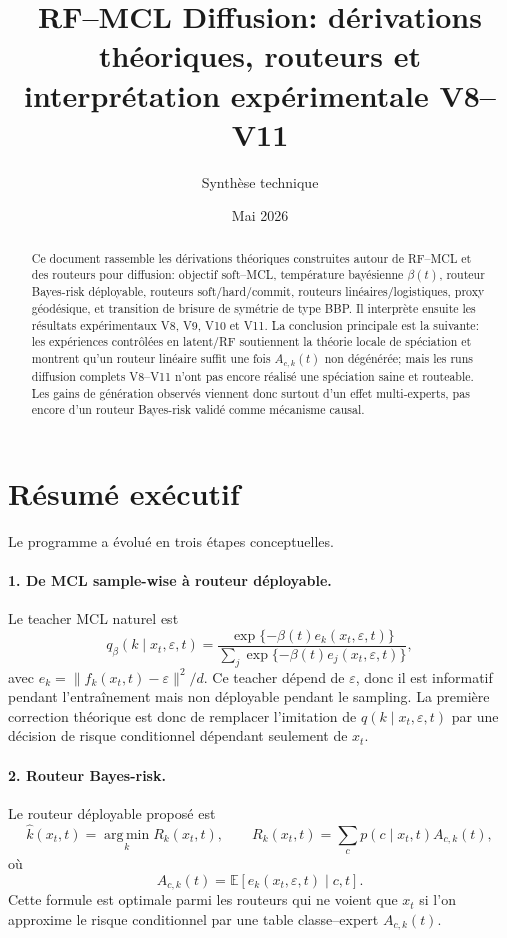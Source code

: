 \documentclass[11pt,a4paper]{article}
\title{RF--MCL Diffusion: dérivations théoriques, routeurs et interprétation expérimentale V8--V11}
\author{Synthèse technique}
\date{Mai 2026}
\newcommand{\E}{\mathbb{E}}
\newcommand{\argmin}{\operatorname*{arg\,min}}
\newcommand{\1}{\mathbf{1}}
\newcommand{\eps}{\varepsilon}
\newcommand{\xt}{x_t}
\begin{document}
\maketitle

\begin{abstract}
Ce document rassemble les dérivations théoriques construites autour de RF--MCL et des routeurs pour diffusion: objectif soft--MCL, température bayésienne $\beta(t)$, routeur Bayes-risk déployable, routeurs soft/hard/commit, routeurs linéaires/logistiques, proxy géodésique, et transition de brisure de symétrie de type BBP. Il interprète ensuite les résultats expérimentaux V8, V9, V10 et V11. La conclusion principale est la suivante: les expériences contrôlées en latent/RF soutiennent la théorie locale de spéciation et montrent qu'un routeur linéaire suffit une fois $A_{c,k}(t)$ non dégénérée; mais les runs diffusion complets V8--V11 n'ont pas encore réalisé une spéciation saine et routeable. Les gains de génération observés viennent donc surtout d'un effet multi-experts, pas encore d'un routeur Bayes-risk validé comme mécanisme causal.
\end{abstract}

\tableofcontents
\newpage

\section{Résumé exécutif}

Le programme a évolué en trois étapes conceptuelles.

\paragraph{1. De MCL sample-wise à routeur déployable.}
Le teacher MCL naturel est
\[
q_\beta(k\mid \xt,\eps,t)=\frac{\exp\{-\beta(t)e_k(\xt,\eps,t)\}}{\sum_j\exp\{-\beta(t)e_j(\xt,\eps,t)\}},
\]
avec $e_k=\|f_k(\xt,t)-\eps\|^2/d$. Ce teacher dépend de $\eps$, donc il est informatif pendant l'entraînement mais non déployable pendant le sampling. La première correction théorique est donc de remplacer l'imitation de $q(k\mid \xt,\eps,t)$ par une décision de risque conditionnel dépendant seulement de $\xt$.

\paragraph{2. Routeur Bayes-risk.}
Le routeur déployable proposé est
\[
\hat k(\xt,t)=\argmin_k R_k(\xt,t),\qquad
R_k(\xt,t)=\sum_c p(c\mid \xt,t)A_{c,k}(t),
\]
où
\[
A_{c,k}(t)=\E\left[e_k(\xt,\eps,t)\mid c,t\right].
\]
Cette formule est optimale parmi les routeurs qui ne voient que $\xt$ si l'on approxime le risque conditionnel par une table classe--expert $A_{c,k}(t)$.
\end{document}
